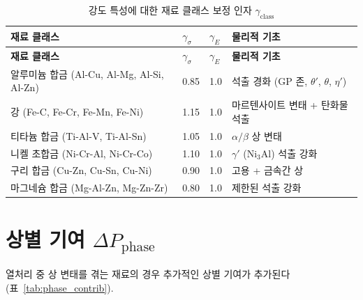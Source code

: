 \documentclass[12pt,a4paper]{article}
\begin{document}
	\begin{longtable}{p{3.5cm} p{2.5cm} p{2.5cm} p{5cm}}
		\caption{강도 특성에 대한 재료 클래스 보정 인자 $\gamma_{\text{class}}$}\label{tab:gamma_class}\\
		\toprule
		\textbf{재료 클래스} & $\gamma_{\sigma}$ & $\gamma_{E}$ & \textbf{물리적 기초} \\
		\midrule
		\endfirsthead
		\toprule
		\textbf{재료 클래스} & $\gamma_{\sigma}$ & $\gamma_{E}$ & \textbf{물리적 기초} \\
		\midrule
		\endhead
		알루미늄 합금 (Al-Cu, Al-Mg, Al-Si, Al-Zn) & 0.85 & 1.0 & 석출 경화 (GP 존, $\theta'$, $\theta$, $\eta'$) \\
		강 (Fe-C, Fe-Cr, Fe-Mn, Fe-Ni) & 1.15 & 1.0 & 마르텐사이트 변태 + 탄화물 석출 \\
		티타늄 합금 (Ti-Al-V, Ti-Al-Sn) & 1.05 & 1.0 & $\alpha/\beta$ 상 변태 \\
		니켈 초합금 (Ni-Cr-Al, Ni-Cr-Co) & 1.10 & 1.0 & $\gamma'$ (Ni$_3$Al) 석출 강화 \\
		구리 합금 (Cu-Zn, Cu-Sn, Cu-Ni) & 0.90 & 1.0 & 고용 + 금속간 상 \\
		마그네슘 합금 (Mg-Al-Zn, Mg-Zn-Zr) & 0.80 & 1.0 & 제한된 석출 강화 \\
		\bottomrule
	\end{longtable}
	
	\section{상별 기여 $\Delta P_{\text{phase}}$}
	열처리 중 상 변태를 겪는 재료의 경우 추가적인 상별 기여가 추가된다 (표~\ref{tab:phase_contrib}).
	
\end{document}
